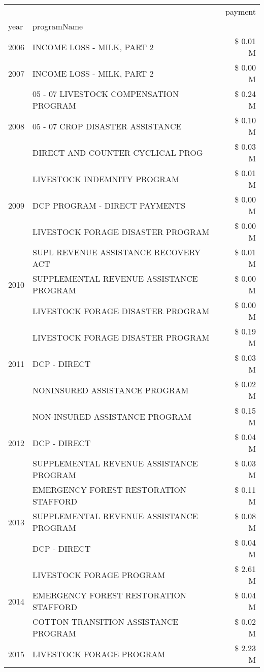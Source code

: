 \begin{tabular}{llr}
\toprule
 &  & payment \\
year & programName &  \\
\midrule
2006 & INCOME LOSS - MILK, PART 2 & \$ 0.01 M \\
\cline{1-3}
2007 & INCOME LOSS - MILK, PART 2 & \$ 0.00 M \\
\cline{1-3}
\multirow[t]{3}{*}{2008} & 05 - 07 LIVESTOCK COMPENSATION PROGRAM & \$ 0.24 M \\
 & 05 - 07 CROP DISASTER ASSISTANCE & \$ 0.10 M \\
 & DIRECT AND COUNTER CYCLICAL PROG & \$ 0.03 M \\
\cline{1-3}
\multirow[t]{3}{*}{2009} & LIVESTOCK INDEMNITY PROGRAM & \$ 0.01 M \\
 & DCP PROGRAM - DIRECT PAYMENTS & \$ 0.00 M \\
 & LIVESTOCK FORAGE DISASTER  PROGRAM & \$ 0.00 M \\
\cline{1-3}
\multirow[t]{3}{*}{2010} & SUPL REVENUE ASSISTANCE RECOVERY ACT & \$ 0.01 M \\
 & SUPPLEMENTAL REVENUE ASSISTANCE PROGRAM & \$ 0.00 M \\
 & LIVESTOCK FORAGE DISASTER  PROGRAM & \$ 0.00 M \\
\cline{1-3}
\multirow[t]{3}{*}{2011} & LIVESTOCK FORAGE DISASTER PROGRAM & \$ 0.19 M \\
 & DCP - DIRECT & \$ 0.03 M \\
 & NONINSURED ASSISTANCE PROGRAM & \$ 0.02 M \\
\cline{1-3}
\multirow[t]{3}{*}{2012} & NON-INSURED ASSISTANCE PROGRAM & \$ 0.15 M \\
 & DCP - DIRECT & \$ 0.04 M \\
 & SUPPLEMENTAL REVENUE ASSISTANCE PROGRAM & \$ 0.03 M \\
\cline{1-3}
\multirow[t]{3}{*}{2013} & EMERGENCY FOREST RESTORATION STAFFORD & \$ 0.11 M \\
 & SUPPLEMENTAL REVENUE ASSISTANCE PROGRAM & \$ 0.08 M \\
 & DCP - DIRECT & \$ 0.04 M \\
\cline{1-3}
\multirow[t]{3}{*}{2014} & LIVESTOCK FORAGE PROGRAM & \$ 2.61 M \\
 & EMERGENCY FOREST RESTORATION STAFFORD & \$ 0.04 M \\
 & COTTON TRANSITION ASSISTANCE PROGRAM & \$ 0.02 M \\
\cline{1-3}
\multirow[t]{2}{*}{2015} & LIVESTOCK FORAGE PROGRAM & \$ 2.23 M \\

\end{tabular}
